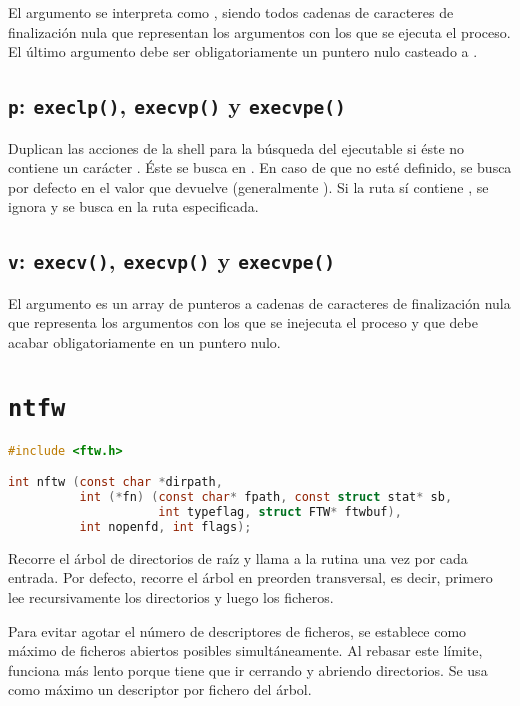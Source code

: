 El argumento  se interpreta como , siendo todos cadenas de caracteres de finalización nula que representan los argumentos con los que se ejecuta el proceso.
El último argumento debe ser obligatoriamente un puntero nulo casteado a .

\subsection{\texttt{p}: \texttt{execlp()}, \texttt{execvp()} y \texttt{execvpe()}}

Duplican las acciones de la shell para la búsqueda del ejecutable si éste no contiene un carácter \code{/}.
Éste se busca en .
En caso de que no esté definido, se busca por defecto en el valor que devuelve  (generalmente ).
Si la ruta sí contiene \code{/}, se ignora  y se busca en la ruta especificada.

\subsection{\texttt{v}: \texttt{execv()}, \texttt{execvp()} y \texttt{execvpe()}}

El argumento  es un array de punteros a cadenas de caracteres de finalización nula que representa los argumentos con los que se inejecuta el proceso y que debe acabar obligatoriamente en un puntero nulo.

\section{\texttt{ntfw}}\label{ntfw}

\begin{lstlisting}[language=C]
#include <ftw.h>

int nftw (const char *dirpath,
          int (*fn) (const char* fpath, const struct stat* sb,
                     int typeflag, struct FTW* ftwbuf),
          int nopenfd, int flags);
\end{lstlisting}

Recorre el árbol de directorios de raíz  y llama a la rutina  una vez por cada entrada.
Por defecto, recorre el árbol en preorden transversal, es decir, primero lee recursivamente los directorios y luego los ficheros.

Para evitar agotar el número de descriptores de ficheros, se establece  como máximo de ficheros abiertos posibles simultáneamente.
Al rebasar este límite,  funciona más lento porque tiene que ir cerrando y abriendo directorios.
Se usa como máximo un descriptor por fichero del árbol.

